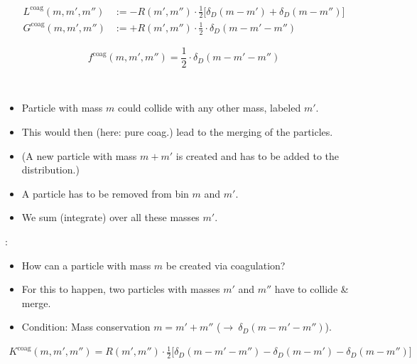     \begin{align}
        L^\text{coag}(m, m', m'') 
            &:= -R(m',m'') \cdot \frac{1}{2} \bigg[\delta_D(m-m')+\delta_D(m-m'')\bigg] \\
        G^\text{coag}(m, m', m'') 
            &:= +R(m',m'') \cdot \frac{1}{2} \cdot \delta_D(m-m'-m'')
    \end{align}

    \begin{equation}
        f^\text{coag}(m,m',m'') = \frac{1}{2} \cdot \delta_D(m-m'-m'')
    \end{equation}

     \\

    \begin{itemize}
        \item Particle with mass $m$ could collide with any other mass, labeled $m'$.
        \item This would then (here: pure coag.) lead to the merging of the particles.
        \item (A new particle with mass $m+m'$ is created and has to be added to the distribution.)
        \item A particle has to be removed from bin $m$ and $m'$.
        \item We sum (integrate) over all these masses $m'$.
    \end{itemize}

    :
    \begin{itemize}
        \item How can a particle with mass $m$ be created via coagulation?
        \item For this to happen, two particles with masses $m'$ and $m''$ have to collide \& merge.
        \item Condition: Mass conservation $m=m'+m''$ ($\to\ \delta_D(m-m'-m'')$).
    \end{itemize}

    \begin{align}
        K^\text{coag}(m,m',m'') = R(m',m'') \cdot \frac{1}{2}
        \bigg[
            \delta_D(m-m'-m'') - \delta_D(m-m') - \delta_D(m-m'')
        \bigg]
    \end{align}

    \clearpage

